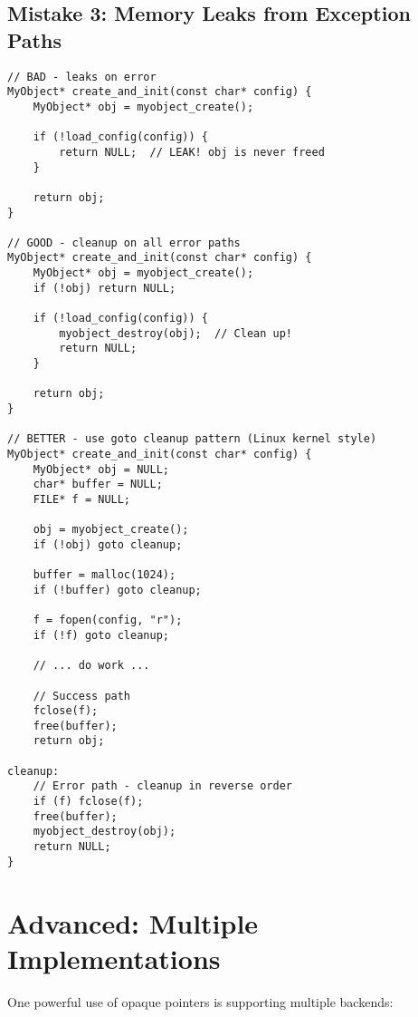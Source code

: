 \subsection{Mistake 3: Memory Leaks from Exception Paths}

\begin{lstlisting}
// BAD - leaks on error
MyObject* create_and_init(const char* config) {
    MyObject* obj = myobject_create();

    if (!load_config(config)) {
        return NULL;  // LEAK! obj is never freed
    }

    return obj;
}

// GOOD - cleanup on all error paths
MyObject* create_and_init(const char* config) {
    MyObject* obj = myobject_create();
    if (!obj) return NULL;

    if (!load_config(config)) {
        myobject_destroy(obj);  // Clean up!
        return NULL;
    }

    return obj;
}

// BETTER - use goto cleanup pattern (Linux kernel style)
MyObject* create_and_init(const char* config) {
    MyObject* obj = NULL;
    char* buffer = NULL;
    FILE* f = NULL;

    obj = myobject_create();
    if (!obj) goto cleanup;

    buffer = malloc(1024);
    if (!buffer) goto cleanup;

    f = fopen(config, "r");
    if (!f) goto cleanup;

    // ... do work ...

    // Success path
    fclose(f);
    free(buffer);
    return obj;

cleanup:
    // Error path - cleanup in reverse order
    if (f) fclose(f);
    free(buffer);
    myobject_destroy(obj);
    return NULL;
}
\end{lstlisting}

\section{Advanced: Multiple Implementations}

One powerful use of opaque pointers is supporting multiple backends:

